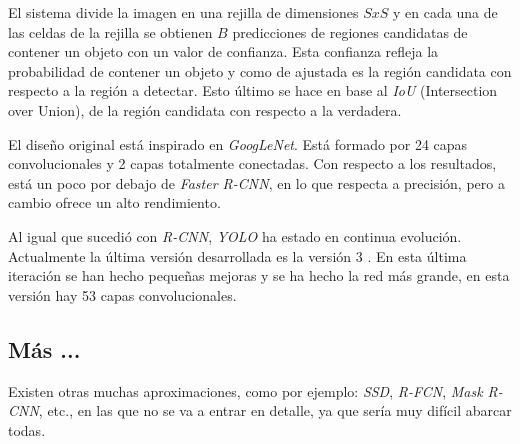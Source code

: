 El sistema divide la imagen en una rejilla de dimensiones $SxS$ y en cada una de las celdas de la rejilla se obtienen $B$ predicciones de regiones candidatas de contener un objeto con un valor de confianza. Esta confianza refleja la probabilidad de contener un objeto y como de ajustada es la región candidata con respecto a la región a detectar. Esto último se hace en base al \textit{IoU} (Intersection over Union), de la región candidata con respecto a la verdadera.

El diseño original está inspirado en \textit{GoogLeNet}. Está formado por 24 capas convolucionales y 2 capas totalmente conectadas. Con respecto a los resultados, está un poco por debajo de \textit{Faster R-CNN}, en lo que respecta a precisión, pero a cambio ofrece un alto rendimiento.

Al igual que sucedió con \textit{R-CNN}, \textit{YOLO} ha estado en continua evolución. Actualmente la última versión desarrollada es la versión 3 \cite{s2_stateofart_yolov3}. En esta última iteración se han hecho pequeñas mejoras y se ha hecho la red más grande, en esta versión hay 53 capas convolucionales.

\subsection*{Más ...}

Existen otras muchas aproximaciones, como por ejemplo: \textit{SSD}, \textit{R-FCN}, \textit{Mask R-CNN}, etc., en las que no se va a entrar en detalle, ya que sería muy difícil abarcar todas.